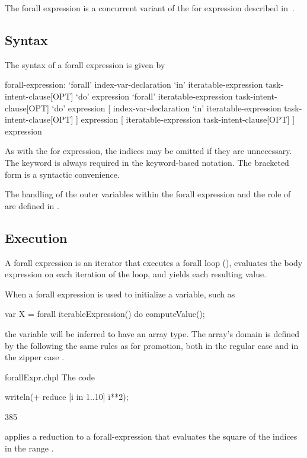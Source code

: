 The forall expression is a concurrent variant of the for expression
described in~.

\subsection{Syntax}
\label{forall_expr_syntax}

The syntax of a forall expression is given by
\begin{syntax}
forall-expression:
  `forall' index-var-declaration `in' iteratable-expression task-intent-clause[OPT] `do' expression
  `forall' iteratable-expression task-intent-clause[OPT] `do' expression
  [ index-var-declaration `in' iteratable-expression task-intent-clause[OPT] ] expression
  [ iteratable-expression task-intent-clause[OPT] ] expression
\end{syntax}
As with the for expression, the indices may be omitted if they are
unnecessary.  The  keyword is always required in the
keyword-based notation.  The bracketed form is a syntactic
convenience.

The handling of the outer variables within the forall expression and
the role of  are defined in .

\subsection{Execution}
\label{Forall_Expression_Execution}

A forall expression is an iterator that executes a forall loop (),
evaluates the body expression on each iteration of the loop,
and yields each resulting value.

When a forall expression is used to initialize a variable, such as
\begin{chapel}
var X = forall iterableExpression() do computeValue();
\end{chapel}
the variable will be inferred to have an array type.
The array's domain is defined by the 
following the same rules as for promotion, both in the regular
case  and in the zipper case .

\begin{chapelexample}{forallExpr.chpl}
The code
\begin{chapel}
writeln(+ reduce [i in 1..10] i**2);
\end{chapel}
\begin{chapeloutput}
385
\end{chapeloutput}
applies a reduction to a forall-expression that evaluates the square
of the indices in the range .
\end{chapelexample}

